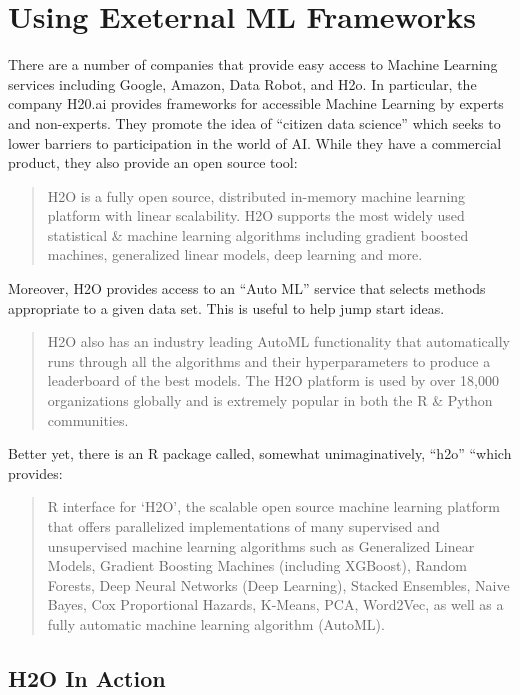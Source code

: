 \documentclass[]{book}
\begin{document}
\chapter{Using Exeternal ML
Frameworks}\label{using-exeternal-ml-frameworks}

There are a number of companies that provide easy access to Machine
Learning services including Google, Amazon, Data Robot, and H2o. In
particular, the company H20.ai provides frameworks for accessible
Machine Learning by experts and non-experts. They promote the idea of
``citizen data science'' which seeks to lower barriers to participation
in the world of AI. While they have a commercial product, they also
provide an open source tool:

\begin{quote}
H2O is a fully open source, distributed in-memory machine learning
platform with linear scalability. H2O supports the most widely used
statistical \& machine learning algorithms including gradient boosted
machines, generalized linear models, deep learning and more.
\end{quote}

Moreover, H2O provides access to an ``Auto ML'' service that selects
methods appropriate to a given data set. This is useful to help jump
start ideas.

\begin{quote}
H2O also has an industry leading AutoML functionality that automatically
runs through all the algorithms and their hyperparameters to produce a
leaderboard of the best models. The H2O platform is used by over 18,000
organizations globally and is extremely popular in both the R \& Python
communities.
\end{quote}

Better yet, there is an R package called, somewhat unimaginatively,
``h2o'' ``which provides:

\begin{quote}
R interface for `H2O', the scalable open source machine learning
platform that offers parallelized implementations of many supervised and
unsupervised machine learning algorithms such as Generalized Linear
Models, Gradient Boosting Machines (including XGBoost), Random Forests,
Deep Neural Networks (Deep Learning), Stacked Ensembles, Naive Bayes,
Cox Proportional Hazards, K-Means, PCA, Word2Vec, as well as a fully
automatic machine learning algorithm (AutoML).
\end{quote}

\section{H2O In Action}\label{h2o-in-action}
\end{document}
